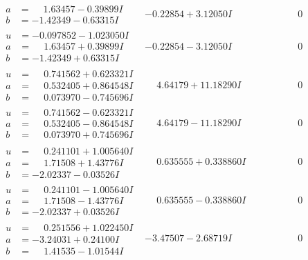 \documentclass[1p]{elsarticle_modified}
\theoremstyle{definition}
\begin{document}
$$\begin{array}{c|c|c}
\begin{aligned}
a &= \phantom{-}1.63457 - 0.39899 I \\
b &= -1.42349 - 0.63315 I\end{aligned}
 & -0.22854 + 3.12050 I & \phantom{-0.000000 } 0 \\ \hline\begin{aligned}
u &= -0.097852 - 1.023050 I \\
a &= \phantom{-}1.63457 + 0.39899 I \\
b &= -1.42349 + 0.63315 I\end{aligned}
 & -0.22854 - 3.12050 I & \phantom{-0.000000 } 0 \\ \hline\begin{aligned}
u &= \phantom{-}0.741562 + 0.623321 I \\
a &= \phantom{-}0.532405 + 0.864548 I \\
b &= \phantom{-}0.073970 - 0.745696 I\end{aligned}
 & \phantom{-}4.64179 + 11.18290 I & \phantom{-0.000000 } 0 \\ \hline\begin{aligned}
u &= \phantom{-}0.741562 - 0.623321 I \\
a &= \phantom{-}0.532405 - 0.864548 I \\
b &= \phantom{-}0.073970 + 0.745696 I\end{aligned}
 & \phantom{-}4.64179 - 11.18290 I & \phantom{-0.000000 } 0 \\ \hline\begin{aligned}
u &= \phantom{-}0.241101 + 1.005640 I \\
a &= \phantom{-}1.71508 + 1.43776 I \\
b &= -2.02337 - 0.03526 I\end{aligned}
 & \phantom{-}0.635555 + 0.338860 I & \phantom{-0.000000 } 0 \\ \hline\begin{aligned}
u &= \phantom{-}0.241101 - 1.005640 I \\
a &= \phantom{-}1.71508 - 1.43776 I \\
b &= -2.02337 + 0.03526 I\end{aligned}
 & \phantom{-}0.635555 - 0.338860 I & \phantom{-0.000000 } 0 \\ \hline\begin{aligned}
u &= \phantom{-}0.251556 + 1.022450 I \\
a &= -3.24031 + 0.24100 I \\
b &= \phantom{-}1.41535 - 1.01544 I\end{aligned}
 & -3.47507 - 2.68719 I & \phantom{-0.000000 } 0 \\ \hline\begin{aligned}

\end{aligned}
\end{array}$$
\end{document}
